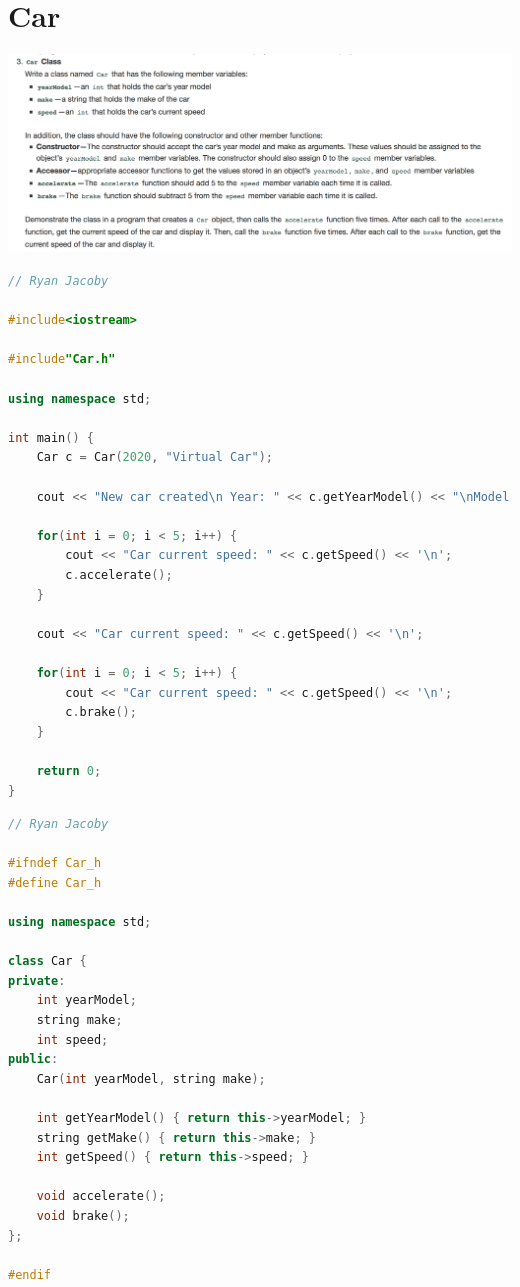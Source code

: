 \documentclass[letterpaper, 11pt]{article}
\begin{document}
\section{Car}

\includegraphics[scale=0.35]{car.png} 

\begin{lstlisting}[language=C++, caption=main.cpp]
// Ryan Jacoby

#include<iostream>

#include"Car.h"

using namespace std;

int main() {
    Car c = Car(2020, "Virtual Car");

    cout << "New car created\n Year: " << c.getYearModel() << "\nModel: " << c.getMake() << '\n';

    for(int i = 0; i < 5; i++) {
        cout << "Car current speed: " << c.getSpeed() << '\n';
        c.accelerate();
    }

    cout << "Car current speed: " << c.getSpeed() << '\n';

    for(int i = 0; i < 5; i++) {
        cout << "Car current speed: " << c.getSpeed() << '\n';
        c.brake();
    }

    return 0;
}
\end{lstlisting}

\begin{lstlisting}[language=C++, caption=Car.h]
// Ryan Jacoby

#ifndef Car_h
#define Car_h

using namespace std;

class Car {
private:
    int yearModel;
    string make;
    int speed;
public:
    Car(int yearModel, string make);

    int getYearModel() { return this->yearModel; }
    string getMake() { return this->make; }
    int getSpeed() { return this->speed; }

    void accelerate();
    void brake();
};

#endif
\end{lstlisting}
\end{document}
